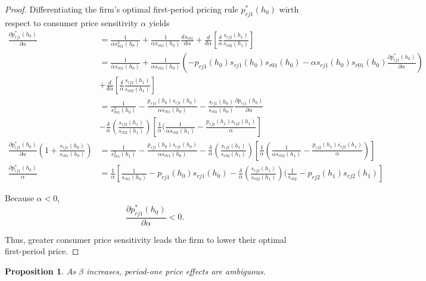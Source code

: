 \documentclass[12pt]{article}
\newtheorem{proposition}{Proposition}
\theoremstyle{definition}
\theoremstyle{remark}
\begin{document}
\begin{proof}
  Differentiating the firm's optimal first-period pricing rule $p_{rj1}^*(h_0)$
  wirth respect to consumer price sensitivity $\alpha$ yields
  \begin{align*}
    \frac{\partial p_{rj1}^*(h_0)}{\partial\alpha} &= \frac{1}{\alpha s_{r01}^2(h_0)} + \frac{1}{\alpha s_{r01}(h_0)}\frac{ds_{r01}}{d\alpha} + \frac{d}{d\alpha}[\frac{\delta}{\alpha}\frac{s_{rj2}(h_1)}{s_{r02}(h_1)}] \\
    &= \frac{1}{\alpha s_{r01}(h_0)} + \frac{1}{\alpha
    s_{r01}(h_0)}(-p_{rj1}(h_0)s_{rj1}(h_0)s_{r01}(h_0) - \alpha
    s_{rj1}(h_0)s_{r01}(h_0)\frac{\partial p_{rj1}^*(h_0)}{\partial \alpha})\\ &+
    \frac{d}{d\alpha}[\frac{\delta}{\alpha}\frac{s_{rj2}(h_1)}{s_{r02}(h_1)}] \\
    &= \frac{1}{s_{r01}^2(h_0)} - \frac{p_{rj1}(h_0)s_{rj1}(h_0)}{\alpha s_{r01}(h_0)} - \frac{s_{rj1}(h_0)}{s_{r01}(h_0)}\frac{\partial p_{rj1}(h_0)}{\partial\alpha} \\
    &-
    \frac{\delta}{\alpha}(\frac{s_{rj2}(h_1)}{s_{r02}(h_1)})[\frac{1}{\alpha}(\frac{1}{\alpha
    s_{r02}(h_1)}-\frac{p_{rj2}(h_1)s_{rj2}(h_1)}{\alpha}] \\
    \frac{\partial p_{rj1}^*(h_0)}{\partial\alpha}(1+\frac{s_{rj1}(h_0)}{s_{r01}(h_0)}) &= \frac{1}{s_{r01}^2(h_1)} - \frac{p_{rj1}(h_0)s_{rj1}(h_0)}{\alpha s_{r01}(h_0)} -
    \frac{\delta}{\alpha}(\frac{s_{rj2}(h_1)}{s_{r02}(h_1)})[\frac{1}{\alpha}(\frac{1}{\alpha
    s_{r02}(h_1)}-\frac{p_{rj2}(h_1)s_{rj2}(h_1)}{\alpha})] \\
    \frac{\partial p_{rj1}^*(h_0)}{\alpha} &=
    \frac{1}{\alpha}[\frac{1}{s_{r01}(h_0)} - p_{rj1}(h_0)s_{rj1}(h_0) -
    \frac{\delta}{\alpha}(\frac{s_{rj2}(h_1)}{s_{r02}(h_1)})(\frac{1}{s_{r02}} -
    p_{rj2}(h_1)s_{rj2}(h_1)]
  \end{align*}

  Because $\alpha < 0$, 
  \begin{equation}
    \frac{\partial p_{rj1}^*(h_0)}{\partial\alpha} < 0.
  \end{equation}

  Thus, greater consumer price sensitivity leads the firm to lower their optimal
  first-period price.
\end{proof}

\begin{proposition}
\label{prop:four}
  As $\beta$ increases, period-one price effects are ambiguous.
\end{proposition}
\end{document}
